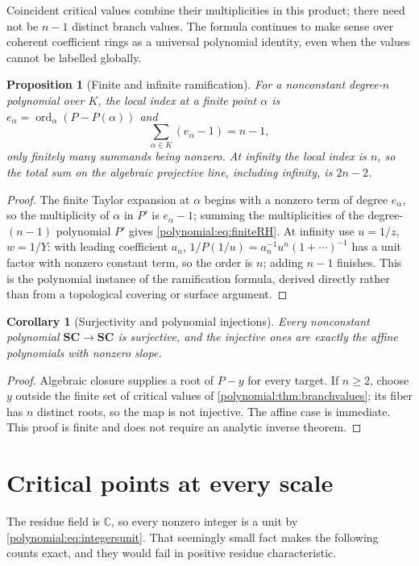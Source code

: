 \documentclass[11pt,letterpaper]{article}
\numberwithin{equation}{section}
\newtheorem{proposition}[theorem]{Proposition}
\newtheorem{corollary}[theorem]{Corollary}
\theoremstyle{definition}
\theoremstyle{remark}\newtheorem{remark}[theorem]{Remark}
\newcommand{\SC}{\mathbf{SC}}
\newcommand{\C}{\mathbb C}
\newcommand{\ord}{\operatorname{ord}}
\begin{document}
Coincident critical values combine their multiplicities in this product;
there need not be $n-1$ distinct branch values. The formula continues to make
sense over coherent coefficient rings as a universal polynomial identity, even
when the values cannot be labelled globally.

\begin{proposition}[Finite and infinite ramification]\label{polynomial:prop:ramification}
For a nonconstant degree-$n$ polynomial over $K$, the local index at a finite
point $\alpha$ is $e_\alpha=\ord_\alpha(P-P(\alpha))$ and
\begin{equation}\label{polynomial:eq:finiteRH}
 \sum_{\alpha\in K}(e_\alpha-1)=n-1,
\end{equation}
only finitely many summands being nonzero. At infinity the local index is $n$,
so the total sum on the algebraic projective line, including infinity, is
$2n-2$.
\end{proposition}
\begin{proof}
The finite Taylor expansion at $\alpha$ begins with a nonzero term of degree
$e_\alpha$, so the multiplicity of $\alpha$ in $P'$ is $e_\alpha-1$; summing
the multiplicities of the degree-$(n-1)$ polynomial $P'$ gives
\eqref{polynomial:eq:finiteRH}. At infinity use $u=1/z$, $w=1/Y$: with leading
coefficient $a_n$, $1/P(1/u)=a_n^{-1}u^n(1+\cdots)^{-1}$ has a unit factor with
nonzero constant term, so the order is $n$; adding $n-1$ finishes. This is the
polynomial instance of the ramification formula, derived directly rather than
from a topological covering or surface argument.
\end{proof}

\begin{corollary}[Surjectivity and polynomial injections]
\label{polynomial:cor:polynomialmaps}
Every nonconstant polynomial $\SC\to\SC$ is surjective, and the injective ones
are exactly the affine polynomials with nonzero slope.
\end{corollary}
\begin{proof}
Algebraic closure supplies a root of $P-y$ for every target. If $n\ge2$,
choose $y$ outside the finite set of critical values of
\cref{polynomial:thm:branchvalues}; its fiber has $n$ distinct roots, so the
map is not injective. The affine case is immediate. This proof is finite and
does not require an analytic inverse theorem.
\end{proof}

\section{Critical points at every scale}\label{polynomial:sec:critical}
The residue field is $\C$, so every nonzero integer is a unit by
\eqref{polynomial:eq:integersunit}. That seemingly small fact makes the
following counts exact, and they would fail in positive residue
characteristic.
\end{document}
